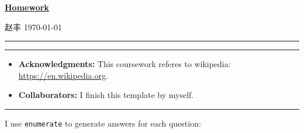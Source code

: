 \documentclass[a4paper]{article}
\begin{document}
\courseheader

\setcounter{hwcnt}{1} %

\begin{center}
  \underline{\bf Homework \thehwcnt} \\
\end{center}
\begin{flushleft}
  赵丰\hfill
  \today
\end{flushleft}
\hrule

\vspace{2em}

\flushleft
\rule{\textwidth}{1pt}
\begin{itemize}
\item {\bf Acknowledgments: \/} 
  This coursework referes to wikipedia: \small{\url{https://en.wikipedia.org}}.

\item {\bf Collaborators: \/}
  I finish this template by myself.
\end{itemize}
\rule{\textwidth}{1pt}

\vspace{2em}

I use \texttt{enumerate} to generate answers for each question:
\end{document}
